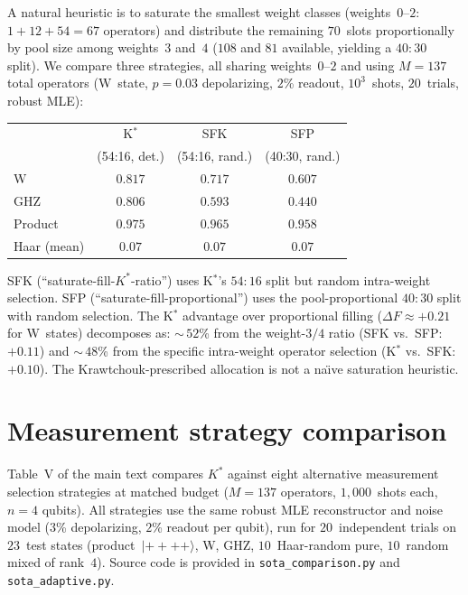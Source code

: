 \documentclass[twocolumn,prx,aps,superscriptaddress,longbibliography]{revtex4-2}
\begin{document}
A natural heuristic is to saturate the smallest weight classes
(weights~$0$--$2$: $1 + 12 + 54 = 67$ operators) and distribute
the remaining $70$~slots proportionally by pool size among
weights~$3$ and~$4$ ($108$ and $81$ available, yielding a $40{:}30$
split).  We compare three strategies, all sharing weights~$0$--$2$
and using $M = 137$ total operators (W~state, $p = 0.03$
depolarizing, $2$\% readout, $10^3$~shots, $20$~trials, robust MLE):

\begin{center}
\begin{tabular}{lccc}
\hline
 & K$^*$ & SFK & SFP \\
 & {\small (54{:}16, det.)} & {\small (54{:}16, rand.)} & {\small (40{:}30, rand.)} \\
\hline
W & $0.817$ & $0.717$ & $0.607$ \\
GHZ & $0.806$ & $0.593$ & $0.440$ \\
Product & $0.975$ & $0.965$ & $0.958$ \\
Haar (mean) & $0.07$ & $0.07$ & $0.07$ \\
\hline
\end{tabular}
\end{center}

\noindent
SFK (``saturate-fill-$K^*$-ratio'') uses K$^*$'s $54{:}16$ split
but random intra-weight selection.  SFP (``saturate-fill-proportional'')
uses the pool-proportional $40{:}30$ split with random selection.
The K$^*$ advantage over proportional filling ($\Delta F \approx +0.21$
for W~states) decomposes as: ${\sim}\,52$\% from the weight-$3/4$
ratio (SFK vs.\ SFP: $+0.11$) and ${\sim}\,48$\% from the specific
intra-weight operator selection (K$^*$ vs.\ SFK: $+0.10$).
The Krawtchouk-prescribed allocation is not a
na\"{\i}ve saturation heuristic.


\section{Measurement strategy comparison}
\label{sec:sota-methodology}

Table~V of the main text compares $K^*$ against eight alternative
measurement selection strategies at matched budget ($M = 137$
operators, $1{,}000$~shots each, $n = 4$ qubits).  All strategies
use the same robust MLE reconstructor and noise model ($3$\%
depolarizing, $2$\% readout per qubit), run for $20$~independent
trials on $23$~test states (product~$|{+}{+}{+}{+}\rangle$,
W, GHZ, $10$~Haar-random pure, $10$~random mixed of rank~$4$).
Source code is provided in \texttt{sota\_comparison.py} and
\texttt{sota\_adaptive.py}.
\end{document}
